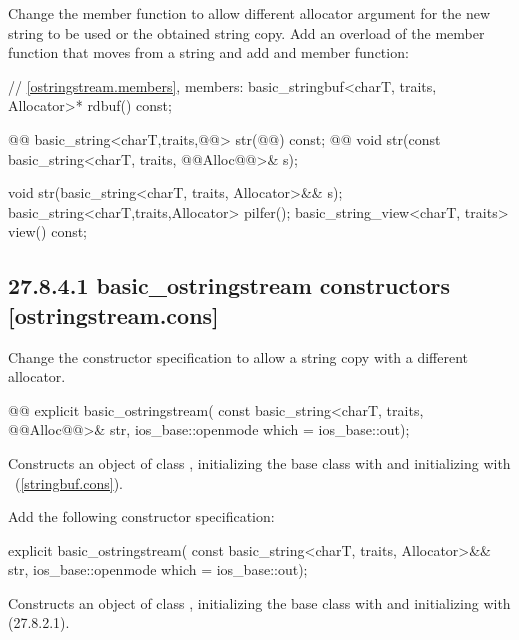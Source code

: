 \documentclass[ebook,11pt,article]{memoir}
\begin{document}
Change the  member function to allow different allocator argument for the new string to be used or the obtained string copy.
Add an overload of the  member function that moves from a string and add  and  member function:

\begin{codeblock}
    // \ref{ostringstream.members}, members:
    basic_stringbuf<charT, traits, Allocator>* rdbuf() const;

    @@
    basic_string<charT,traits,@@> str(@@) const;
    @@
    void str(const basic_string<charT, traits, @@Alloc@@>& s);
\end{codeblock}
\begin{addedblock}
\begin{codeblock}
    void str(basic_string<charT, traits, Allocator>&& s);
    basic_string<charT,traits,Allocator> pilfer();
    basic_string_view<charT, traits> view() const;
\end{codeblock}
\end{addedblock}

\subsection{27.8.4.1 basic\_ostringstream constructors [ostringstream.cons]}
Change the constructor specification to allow a string copy with a different allocator.
\begin{itemdecl}
@@
explicit basic_ostringstream(
  const basic_string<charT, traits, @@Alloc@@>& str,
  ios_base::openmode which = ios_base::out);
\end{itemdecl}

\begin{itemdescr}
\pnum
\effects
Constructs an object of class
,
initializing the base class with
and initializing  with
~(\ref{stringbuf.cons}).
\end{itemdescr}

Add the following constructor specification:
\begin{insrt}
\begin{itemdecl}
explicit basic_ostringstream(
  const basic_string<charT, traits, Allocator>&& str,
  ios_base::openmode which = ios_base::out);
\end{itemdecl}
\begin{itemdescr}
\pnum
\effects Constructs an object of class , initializing the base class with  and initializing  with  (27.8.2.1).
\end{itemdescr}
\end{insrt}
\end{document}
